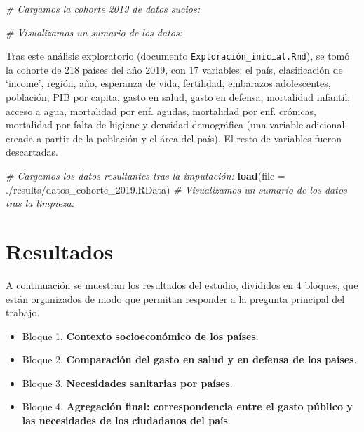 \documentclass[,article,,moreauthors,pdftex]{Definitions/mdpi}
\newenvironment{Shaded}{\begin{snugshade}}{\end{snugshade}}
\newcommand{\AttributeTok}[1]{\textcolor[rgb]{0.13,0.29,0.53}{#1}}
\newcommand{\CommentTok}[1]{\textcolor[rgb]{0.56,0.35,0.01}{\textit{#1}}}
\newcommand{\FunctionTok}[1]{\textcolor[rgb]{0.13,0.29,0.53}{\textbf{#1}}}
\newcommand{\NormalTok}[1]{#1}
\newcommand{\StringTok}[1]{\textcolor[rgb]{0.31,0.60,0.02}{#1}}
\begin{document}
\begin{Shaded}
\begin{Highlighting}[]
\CommentTok{\# Cargamos la cohorte 2019 de datos sucios:}

\CommentTok{\# Visualizamos un sumario de los datos:}
\end{Highlighting}
\end{Shaded}

Tras este análisis exploratorio (documento
\texttt{Exploración\_inicial.Rmd}), se tomó la cohorte de 218 países del
año 2019, con 17 variables: el país, clasificación de `income', región,
año, esperanza de vida, fertilidad, embarazos adolescentes, población,
PIB por capita, gasto en salud, gasto en defensa, mortalidad infantil,
acceso a agua, mortalidad por enf. agudas, mortalidad por enf. crónicas,
mortalidad por falta de higiene y densidad demográfica (una variable
adicional creada a partir de la población y el área del país). El resto
de variables fueron descartadas.

\begin{Shaded}
\begin{Highlighting}[]
\CommentTok{\# Cargamos los datos resultantes tras la imputación: }
\FunctionTok{load}\NormalTok{(}\AttributeTok{file =} \StringTok{\textquotesingle{}./results/datos\_cohorte\_2019.RData\textquotesingle{}}\NormalTok{)}
\CommentTok{\# Visualizamos un sumario de los datos tras la limpieza:}
\end{Highlighting}
\end{Shaded}

\section{Resultados}\label{resultados}

A continuación se muestran los resultados del estudio, divididos en 4
bloques, que están organizados de modo que permitan responder a la
pregunta principal del trabajo.

\begin{itemize}
\item
  Bloque 1. \textbf{Contexto socioeconómico de los países}.
\item
  Bloque 2. \textbf{Comparación del gasto en salud y en defensa de los
  países}.
\item
  Bloque 3. \textbf{Necesidades sanitarias por países}.
\item
  Bloque 4. \textbf{Agregación final: correspondencia entre el gasto
  público y las necesidades de los ciudadanos del país}.
\end{itemize}
\end{document}

